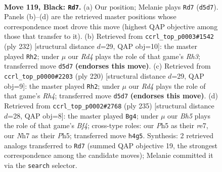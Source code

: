 \documentclass[11pt]{article}
\begin{document}
\clearpage

\begin{figure}[p]\centering
\begin{subfigure}{0.46\textwidth}\centering
\resizebox{\linewidth}{!}{%
\newchessgame
\chessboard[
  setfen={7R/7n/8/3rp2p/6kb/8/3p4/3K4 b - - 3 119},
  showmover=false,
  pgfstyle=straightmove, color=movearrow, markmove={d5-d7}
]}
\caption{}
\end{subfigure}\hfill
\begin{subfigure}{0.46\textwidth}\centering
\resizebox{\linewidth}{!}{%
\newchessgame
\chessboard[
  setfen={8/7k/4K2P/5P2/8/7R/8/1r6 w - - 85 117},
  showmover=false,
  pgfstyle=straightmove, color=movearrow, markmove={h3-h2}
]}
\caption{}
\end{subfigure}
\\[4pt]
\begin{subfigure}{0.46\textwidth}\centering
\resizebox{\linewidth}{!}{%
\newchessgame
\chessboard[
  setfen={8/7k/4K2P/5P2/7R/8/8/1r6 w - - 37 111},
  showmover=false,
  pgfstyle=straightmove, color=movearrow, markmove={h4-h2}
]}
\caption{}
\end{subfigure}\hfill
\begin{subfigure}{0.46\textwidth}\centering
\resizebox{\linewidth}{!}{%
\newchessgame
\chessboard[
  setfen={8/4R3/8/5b1p/4pk1P/3p4/3K4/8 b - - 7 118},
  showmover=false,
  pgfstyle=straightmove, color=movearrow, markmove={f5-g4}
]}
\caption{}
\end{subfigure}
\caption{\textbf{Move 119, Black: \texttt{Rd7}.} (a) Our position; Melanie plays \texttt{Rd7} (\texttt{d5d7}). Panels (b)--(d) are the retrieved master positions whose correspondence most drove this move (highest QAP objective among those that transfer to it). (b) Retrieved from \texttt{ccrl\_top\_p0003\#1542} (ply 232) [structural distance $d$=29, QAP obj=10]: the master played \texttt{Rh2}; under $\mu$ our \emph{Rd4} plays the role of that game's \emph{Rh3}; transferred move \texttt{d5d7} \textbf{(endorses this move)}. (c) Retrieved from \texttt{ccrl\_top\_p0000\#2203} (ply 220) [structural distance $d$=29, QAP obj=9]: the master played \texttt{Rh2}; under $\mu$ our \emph{Rd4} plays the role of that game's \emph{Rh4}; transferred move \texttt{d5d7} \textbf{(endorses this move)}. (d) Retrieved from \texttt{ccrl\_top\_p0002\#2768} (ply 235) [structural distance $d$=28, QAP obj=8]: the master played \texttt{Bg4}; under $\mu$ our \emph{Bh5} plays the role of that game's \emph{Bf4}; cross-type roles: our \emph{P}h5 as their \emph{r}e7, our \emph{N}h7 as their \emph{P}h5; transferred move \texttt{h4g5}. Synthesis: 2 retrieved analogs transferred to \texttt{Rd7} (summed QAP objective 19, the strongest correspondence among the candidate moves); Melanie committed it via the \texttt{search} selector.}
\label{fig:thought-m237}
\end{figure}
\end{document}
